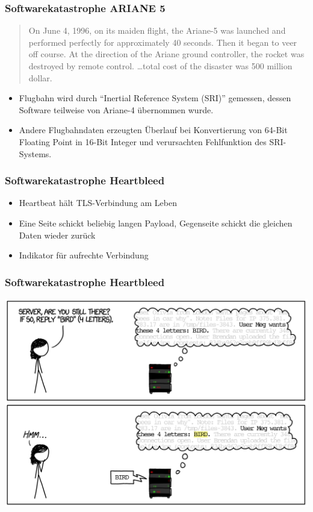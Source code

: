 \begin{frame}
\frametitle{Softwarekatastrophe ARIANE 5}
	\begin{quote}
		On June 4, 1996, on its maiden flight, the Ariane-5 was launched
		and performed perfectly for approximately 40 seconds. Then it began
		to veer off course. At the direction of the Ariane ground controller,
		the rocket was destroyed by remote control. \ldots total cost of the
		disaster was 500 million dollar.
	\end{quote}
	\begin{itemize}
		\item Flugbahn wird durch ``Inertial Reference System (SRI)'' gemessen,
		dessen Software teilweise von Ariane-4 übernommen wurde.
		\item Andere Flugbahndaten erzeugten Überlauf bei
		Konvertierung von 64-Bit Floating Point in 16-Bit Integer
		und verursachten Fehlfunktion des SRI-Systems.
	\end{itemize}
\end{frame}

\begin{frame}
\frametitle{Softwarekatastrophe Heartbleed}
	\begin{itemize}
		\item Heartbeat hält TLS-Verbindung am Leben
		\item Eine Seite schickt beliebig langen Payload, Gegenseite schickt die
		gleichen Daten wieder zurück
		\item Indikator für aufrechte Verbindung
	\end{itemize}
\end{frame}

\begin{frame}
\frametitle{Softwarekatastrophe Heartbleed}
	\center\includegraphics[width=1\textwidth,
	keepaspectratio=true]{bilder/heartbleed1.png}
\end{frame}

